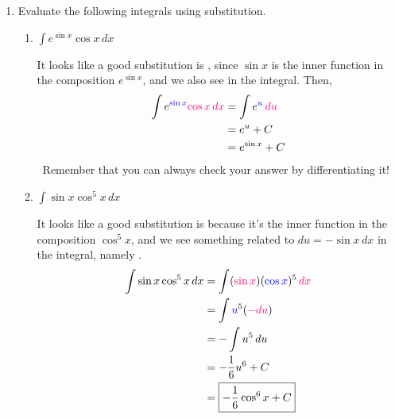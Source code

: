 \documentclass[main]{subfiles}
\begin{document}
\begin{enumerate}
\begin{enumerate}
  \end{enumerate}

\item 

  Evaluate the following integrals using substitution.


  \begin{enumerate}

  \item
    \begin{problem}[\vfill]
      $\displaystyle \int e^{\sin x} \cos x\,dx$
    \end{problem}

    \begin{solution}
      It looks like a good substitution is , since $\sin
      x$ is the inner function in the composition $e^{\sin x}$, and we
      also see  in the integral.  Then,
      \begin{align*}
        \int e^{\sub{\sin x}} \subd{\cos x\,dx} &= \int e^\sub{u}\,\subd{du} \\
        &= e^u + C \\
        &= e^{\sin x} + C
      \end{align*}
      \checkmark\
        Remember that you can always check your answer by differentiating
        it! 
    \end{solution}

  \item
    \begin{problem}[\vfill]
      $\displaystyle \int \sin x \cos^5 x\,dx$
    \end{problem}

    \begin{solution}
      It looks like a good substitution is  because it's
      the inner function in the composition $\cos^5 x$, and we see something related to $du=-\sin x\,dx$ in the integral, namely
      \subd{$-du = \sin x\,dx$}.
      \begin{align*}
        \int \sin x \cos^5 x\,dx & = \int (\subd{\sin x}) (\sub{\cos
          x})^5\,\subd{dx} \\ 
        &= \int \sub{u}^5 (\subd{-du}) \\
        &= - \int u^5\,du \\
        & = - \frac{1}{6} u^6 + C \\
        & = \boxed{- \frac{1}{6} \cos^6 x + C}
      \end{align*}
    \end{solution}


\end{enumerate}
\end{enumerate}
\end{document}
